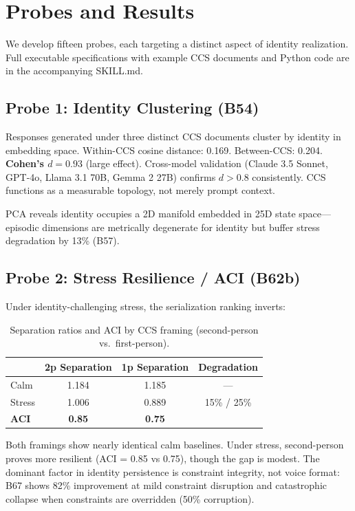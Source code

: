 \documentclass[11pt,a4paper]{article}
\begin{document}
\section{Probes and Results}

We develop fifteen probes, each targeting a distinct aspect of
identity realization. Full executable specifications with example CCS documents and
Python code are in the accompanying SKILL.md.

\subsection{Probe 1: Identity Clustering (B54)}

Responses generated under three distinct CCS documents cluster by identity in
embedding space. Within-CCS cosine distance: 0.169. Between-CCS: 0.204.
\textbf{Cohen's $d = 0.93$} (large effect). Cross-model validation (Claude 3.5
Sonnet, GPT-4o, Llama 3.1 70B, Gemma 2 27B) confirms $d > 0.8$ consistently.
CCS functions as a measurable topology, not merely prompt context.

PCA reveals identity occupies a 2D manifold embedded in 25D state space---episodic
dimensions are metrically degenerate for identity but buffer stress degradation
by 13\% (B57).

\subsection{Probe 2: Stress Resilience / ACI (B62b)}

Under identity-challenging stress, the serialization ranking inverts:

\begin{table}[h]
\centering
\begin{tabular}{lccc}
\toprule
& 2p Separation & 1p Separation & Degradation \\
\midrule
Calm  & 1.184 & 1.185 & --- \\
Stress & 1.006 & 0.889 & 15\% / 25\% \\
\midrule
\textbf{ACI} & \textbf{0.85} & \textbf{0.75} & \\
\bottomrule
\end{tabular}
\caption{Separation ratios and ACI by CCS framing (second-person vs.\ first-person).}
\end{table}

Both framings show nearly identical calm baselines. Under stress, second-person
proves more resilient (ACI = 0.85 vs 0.75), though the gap is modest. The
dominant factor in identity persistence is constraint integrity, not voice
format: B67 shows 82\% improvement at mild constraint disruption and catastrophic
collapse when constraints are overridden (50\% corruption).
\end{document}

